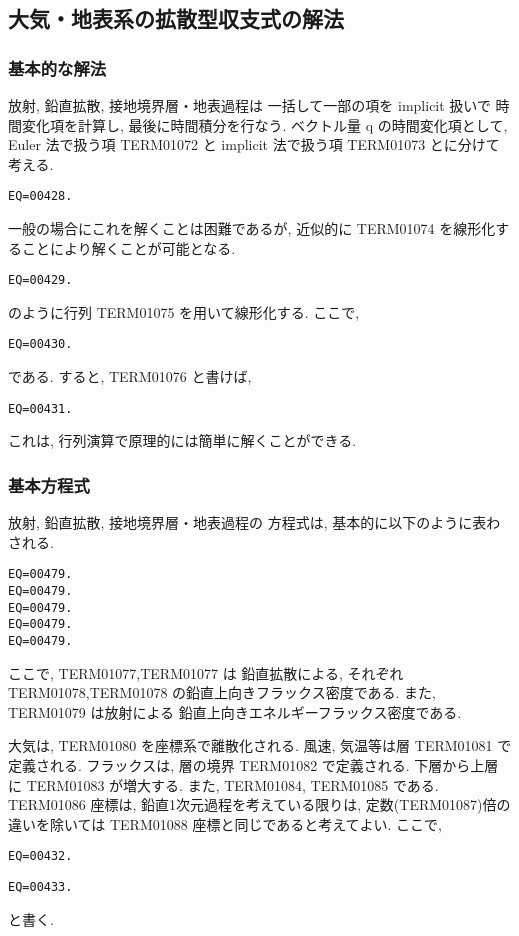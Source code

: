 ﻿
\subsection{大気・地表系の拡散型収支式の解法}

\subsubsection{基本的な解法}

放射, 鉛直拡散, 接地境界層・地表過程は
一括して一部の項を implicit 扱いで
時間変化項を計算し, 最後に時間積分を行なう.
ベクトル量 {\boldmath q} の時間変化項として,
Euler 法で扱う項 TERM01072 と implicit 法で扱う項 TERM01073 とに分けて考える.
%
\begin{verbatim}
EQ=00428.
\end{verbatim}
%
一般の場合にこれを解くことは困難であるが,
近似的に TERM01074 を線形化することにより解くことが可能となる.
\begin{verbatim}
EQ=00429.
\end{verbatim}
のように行列 TERM01075 を用いて線形化する.
ここで,
\begin{verbatim}
EQ=00430.
\end{verbatim}
である. 
すると, 
TERM01076
と書けば,
\begin{verbatim}
EQ=00431.
\end{verbatim}
%
これは, 行列演算で原理的には簡単に解くことができる.

\subsubsection{基本方程式}

放射, 鉛直拡散, 接地境界層・地表過程の
方程式は, 基本的に以下のように表わされる.
%
\begin{verbatim}
EQ=00479.
EQ=00479.
EQ=00479.
EQ=00479.
EQ=00479.
\end{verbatim}
%
ここで, TERM01077,TERM01077 は
鉛直拡散による, それぞれ TERM01078,TERM01078
の鉛直上向きフラックス密度である.
また, TERM01079 は放射による
鉛直上向きエネルギーフラックス密度である.

大気は, TERM01080 を座標系で離散化される.
風速, 気温等は層 TERM01081 で定義される.
フラックスは, 層の境界 TERM01082 で定義される.
下層から上層に TERM01083 が増大する.
また, TERM01084, 
TERM01085 である.
TERM01086 座標は, 鉛直1次元過程を考えている限りは, 
定数(TERM01087)倍の違いを除いては TERM01088 座標と同じであると考えてよい.
ここで,
\begin{verbatim}
EQ=00432.
\end{verbatim}
\begin{verbatim}
EQ=00433.
\end{verbatim}
と書く.


